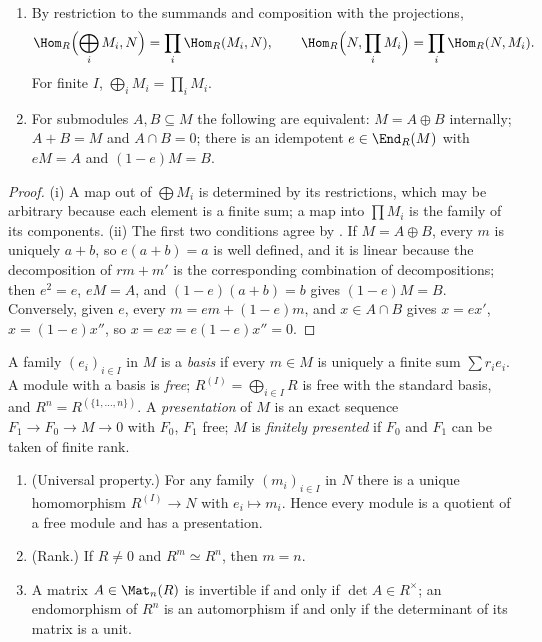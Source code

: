 \begin{proposition}\label{prop:modules:sums}
\begin{enumerate}[label=(\roman*)]
\item By restriction to the summands and composition with the projections,
\[\Hom_R\Bigl(\bigoplus_iM_i,N\Bigr)=\prod_i\Hom_R(M_i,N),\qquad\Hom_R\Bigl(N,\prod_iM_i\Bigr)=\prod_i\Hom_R(N,M_i).\] For finite $I$, $\bigoplus_iM_i=\prod_iM_i$.
\item For submodules $A,B\subseteq M$ the following are equivalent: $M=A\oplus B$ internally; $A+B=M$ and $A\cap B=0$; there is
an idempotent $e\in\End_R(M)$ with $eM=A$ and $(1-e)M=B$.
\end{enumerate}
\end{proposition}

\begin{proof}
(i) A map out of $\bigoplus M_i$ is determined by its restrictions, which may be arbitrary because each element is a finite
sum; a map into $\prod M_i$ is the family of its components. (ii) The first two conditions agree by
. If $M=A\oplus B$, every $m$ is uniquely $a+b$, so $e(a+b)=a$ is well defined, and it is linear
because the decomposition of $rm+m'$ is the corresponding combination of decompositions; then $e^2=e$, $eM=A$, and $(1-e)(a+b)=b$
gives $(1-e)M=B$. Conversely, given $e$,
every $m=em+(1-e)m$, and $x\in A\cap B$ gives $x=ex'$, $x=(1-e)x''$, so $x=ex=e(1-e)x''=0$.
\end{proof}

\begin{definition}\label{def:modules:free}
A family $(e_i)_{i\in I}$ in $M$ is a \emph{basis} if every $m\in M$ is uniquely a finite sum $\sum r_ie_i$. A module with a
basis is \emph{free}; $R^{(I)}=\bigoplus_{i\in I}R$ is free with the standard basis, and $R^n=R^{(\{1,\dots,n\})}$. A
\emph{presentation} of $M$ is an exact sequence $F_1\to F_0\to M\to0$ with $F_0$, $F_1$ free; $M$ is \emph{finitely presented} if
$F_0$ and $F_1$ can be taken of finite rank.
\end{definition}

\begin{proposition}\label{prop:modules:free}
\begin{enumerate}[label=(\roman*)]
\item (Universal property.) For any family $(m_i)_{i\in I}$ in $N$ there is a unique homomorphism $R^{(I)}\to N$ with
$e_i\mapsto m_i$. Hence every module is a quotient of a free module and has a presentation.
\item (Rank.) If $R\ne0$ and $R^m\simeq R^n$, then $m=n$.
\item A matrix $A\in\Mat_n(R)$ is invertible if and only if $\det A\in R^\times$; an endomorphism of $R^n$ is an automorphism if and
only if the determinant of its matrix is a unit.
\end{enumerate}
\end{proposition}


